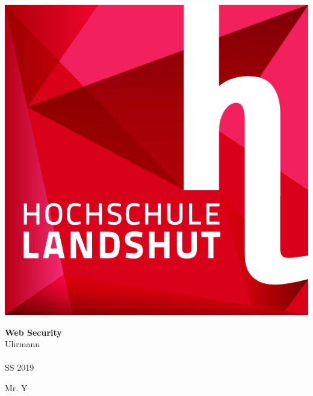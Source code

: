 \begin{titlepage}


\begin{center}
 		\includegraphics[scale=1]{Resources/Haw}
\end{center}

\begin{center}
	\HUGE \textbf{Web Security}
	\large\\Uhrmann\\ \ \\
	\small SS 2019 \\
\end{center}

\begin{center}
Mr. Y
\end{center}

\end{titlepage}
